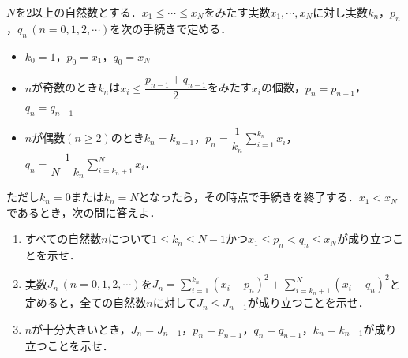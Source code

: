 \documentclass[../../main.tex]{subfiles}
\begin{document}
$N$を$2$以上の自然数とする．$x_1\le \cdots \le x_N$をみたす実数$x_1,\cdots,x_N$に対し実数$k_n$，$p_n$，$q_n\, (n=0,1,2,\cdots)$を次の手続きで定める．
\begin{itemize}
  \item[A] $k_0=1$，$p_0=x_1$，$q_0=x_N$
  \item[B] $n$が奇数のとき$k_n$は$x_i\le \dfrac{p_{n-1}+q_{n-1}}{2}$をみたす$x_i$の個数，$p_n=p_{n-1}$，$q_n=q_{n-1}$
  \item[C] $n$が偶数$(n\ge 2)$のとき$k_n=k_{n-1}$，$p_n=\dfrac{1}{k_n}\sum_{i=1}^{k_n}x_i$，$q_n=\dfrac{1}{N-k_n}\sum_{i=k_n+1}^{N}x_i$．
\end{itemize}
ただし$k_n=0$または$k_n=N$となったら，その時点で手続きを終了する．$x_1<x_N$であるとき，次の問に答えよ．
\begin{enumerate}
  \item すべての自然数$n$について$1\le k_n\le N-1$かつ$x_1\le p_n<q_n\le x_N$が成り立つことを示せ．
  \item 実数$J_n\,(n=0,1,2,\cdots)$を$J_n=\sum_{i=1}^{k_n}(x_i-p_n)^2+\sum_{i=k_n+1}^{N}(x_i-q_n)^2$と定めると，全ての自然数$n$に対して$J_n\le J_{n-1}$が成り立つことを示せ．
  \item $n$が十分大きいとき，$J_n=J_{n-1}$，$p_n=p_{n-1}$，$q_n=q_{n-1}$，$k_n=k_{n-1}$が成り立つことを示せ．
\end{enumerate}
\end{document}
